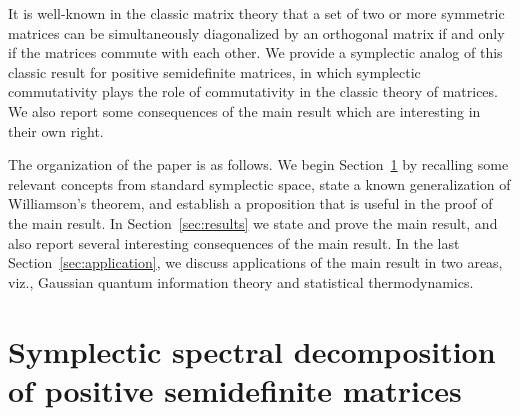 \documentclass[preprint,12pt]{elsarticle}
\begin{document}
    It is well-known in the classic matrix theory that a set of two or more symmetric matrices can be simultaneously diagonalized by an orthogonal matrix if and only if the matrices commute with each other.
    We provide a symplectic analog of this classic result for positive semidefinite matrices, in which symplectic commutativity plays the role of commutativity in the classic theory of matrices.
    We also report some consequences of the main result which are interesting in their own right.

    The organization of the paper is as follows.
    We begin Section~\ref{sec:symp_normal_form} by recalling some relevant concepts from standard symplectic space, state a known generalization of Williamson's theorem, and establish a proposition that is useful in the proof of the main result.
    In Section~\ref{sec:results} we state and prove the main result, and also report several interesting consequences of the main result.
    In the last Section~\ref{sec:application}, we discuss applications of the main result in two areas, viz., Gaussian quantum information theory and statistical thermodynamics.
    
   




    









\section{Symplectic spectral decomposition of positive semidefinite matrices}
\label{sec:symp_normal_form}
\end{document}
